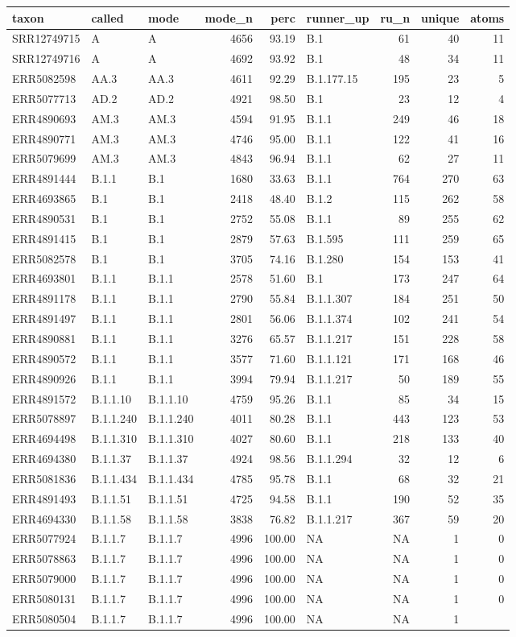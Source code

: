 \documentclass[
]{article}
\begin{document}
\begin{longtable}[]{@{}lllrrlrrr@{}}
\toprule
taxon & called & mode & mode\_n & perc & runner\_up & ru\_n & unique &
atoms\tabularnewline
\midrule
\endhead
SRR12749715 & A & A & 4656 & 93.19 & B.1 & 61 & 40 & 11\tabularnewline
SRR12749716 & A & A & 4692 & 93.92 & B.1 & 48 & 34 & 11\tabularnewline
ERR5082598 & AA.3 & AA.3 & 4611 & 92.29 & B.1.177.15 & 195 & 23 &
5\tabularnewline
ERR5077713 & AD.2 & AD.2 & 4921 & 98.50 & B.1 & 23 & 12 &
4\tabularnewline
ERR4890693 & AM.3 & AM.3 & 4594 & 91.95 & B.1.1 & 249 & 46 &
18\tabularnewline
ERR4890771 & AM.3 & AM.3 & 4746 & 95.00 & B.1.1 & 122 & 41 &
16\tabularnewline
ERR5079699 & AM.3 & AM.3 & 4843 & 96.94 & B.1.1 & 62 & 27 &
11\tabularnewline
ERR4891444 & B.1.1 & B.1 & 1680 & 33.63 & B.1.1 & 764 & 270 &
63\tabularnewline
ERR4693865 & B.1 & B.1 & 2418 & 48.40 & B.1.2 & 115 & 262 &
58\tabularnewline
ERR4890531 & B.1 & B.1 & 2752 & 55.08 & B.1.1 & 89 & 255 &
62\tabularnewline
ERR4891415 & B.1 & B.1 & 2879 & 57.63 & B.1.595 & 111 & 259 &
65\tabularnewline
ERR5082578 & B.1 & B.1 & 3705 & 74.16 & B.1.280 & 154 & 153 &
41\tabularnewline
ERR4693801 & B.1.1 & B.1.1 & 2578 & 51.60 & B.1 & 173 & 247 &
64\tabularnewline
ERR4891178 & B.1.1 & B.1.1 & 2790 & 55.84 & B.1.1.307 & 184 & 251 &
50\tabularnewline
ERR4891497 & B.1.1 & B.1.1 & 2801 & 56.06 & B.1.1.374 & 102 & 241 &
54\tabularnewline
ERR4890881 & B.1.1 & B.1.1 & 3276 & 65.57 & B.1.1.217 & 151 & 228 &
58\tabularnewline
ERR4890572 & B.1.1 & B.1.1 & 3577 & 71.60 & B.1.1.121 & 171 & 168 &
46\tabularnewline
ERR4890926 & B.1.1 & B.1.1 & 3994 & 79.94 & B.1.1.217 & 50 & 189 &
55\tabularnewline
ERR4891572 & B.1.1.10 & B.1.1.10 & 4759 & 95.26 & B.1.1 & 85 & 34 &
15\tabularnewline
ERR5078897 & B.1.1.240 & B.1.1.240 & 4011 & 80.28 & B.1.1 & 443 & 123 &
53\tabularnewline
ERR4694498 & B.1.1.310 & B.1.1.310 & 4027 & 80.60 & B.1.1 & 218 & 133 &
40\tabularnewline
ERR4694380 & B.1.1.37 & B.1.1.37 & 4924 & 98.56 & B.1.1.294 & 32 & 12 &
6\tabularnewline
ERR5081836 & B.1.1.434 & B.1.1.434 & 4785 & 95.78 & B.1.1 & 68 & 32 &
21\tabularnewline
ERR4891493 & B.1.1.51 & B.1.1.51 & 4725 & 94.58 & B.1.1 & 190 & 52 &
35\tabularnewline
ERR4694330 & B.1.1.58 & B.1.1.58 & 3838 & 76.82 & B.1.1.217 & 367 & 59 &
20\tabularnewline
ERR5077924 & B.1.1.7 & B.1.1.7 & 4996 & 100.00 & NA & NA & 1 &
0\tabularnewline
ERR5078863 & B.1.1.7 & B.1.1.7 & 4996 & 100.00 & NA & NA & 1 &
0\tabularnewline
ERR5079000 & B.1.1.7 & B.1.1.7 & 4996 & 100.00 & NA & NA & 1 &
0\tabularnewline
ERR5080131 & B.1.1.7 & B.1.1.7 & 4996 & 100.00 & NA & NA & 1 &
0\tabularnewline
ERR5080504 & B.1.1.7 & B.1.1.7 & 4996 & 100.00 & NA & NA & 1 &

\end{longtable}
\end{document}
